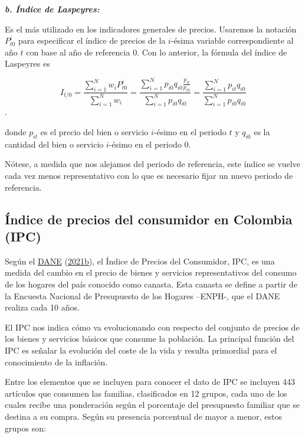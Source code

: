 \documentclass[
  11pt,
]{book}
\begin{document}
\textbf{\emph{b. Índice de Laspeyres:}}

Es el más utilizado en los indicadores generales de precios. Usaremos la notación \(P_{t0}^{i}\) para especificar el índice de precios de la \(i\)-ésima variable correspondiente al año \(t\) con base al año de referencia 0. Con lo anterior, la fórmula del índice de Laspeyres es

\[ {I}_{t/0}=\frac{\sum^{N}_{i=1}w_iP_{t0}^{i}}{\sum^{N}_{i=1}w_i}= \frac{\sum^{N}_{i=1}p_{i0}q_{i0}\frac{p_{it}}{p_{i0}}}{\sum^{N}_{i=1}p_{i0}q_{i0}}=\frac{\sum^{N}_{i=1}p_{it}q_{i0}}{\sum^{N}_{i=1}p_{i0}q_{i0}}\].

donde \(p_{it}\) es el precio del bien o servicio \(i\)-ésimo en el periodo \(t\) y \(q_{i0}\) es la cantidad del bien o servicio \(i\)-ésimo en el periodo 0.

Nótese, a medida que nos alejamos del periodo de referencia, este índice se vuelve cada vez menos representativo con lo que es necesario fijar un nuevo periodo de referencia.

\hypertarget{ipc}{%
\subsection{Índice de precios del consumidor en Colombia (IPC)}\label{ipc}}

Según el \protect\hyperlink{ref-DeCastroRamos2021Sep2}{DANE} (\protect\hyperlink{ref-DeCastroRamos2021Sep2}{2021b}), el Índice de Precios del Consumidor, IPC, es una medida del cambio en el precio de bienes y servicios representativos del consumo de los hogares del país conocido como canasta. Esta canasta se define a partir de la Encuesta Nacional de Presupuesto de los Hogares --ENPH-, que el DANE realiza cada 10 años.

El IPC nos indica cómo va evolucionando con respecto del conjunto de precios de los bienes y servicios básicos que consume la población. La principal función del IPC es señalar la evolución del coste de la vida y resulta primordial para el conocimiento de la inflación.

Entre los elementos que se incluyen para conocer el dato de IPC se incluyen 443 artículos que consumen las familias, clasificados en 12 grupos, cada uno de los cuales recibe una ponderación según el porcentaje del presupuesto familiar que se destina a su compra. Según su presencia porcentual de mayor a menor, estos grupos son:
\end{document}
